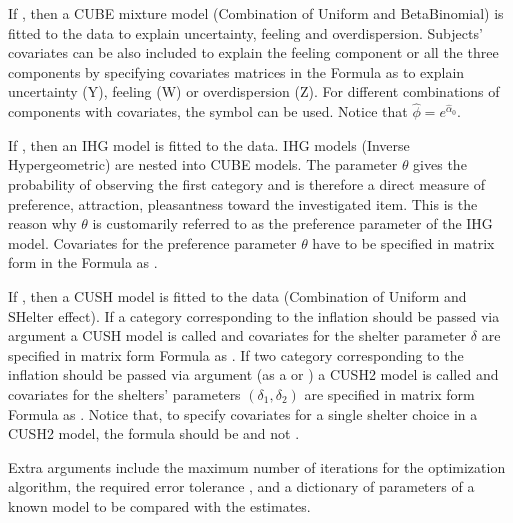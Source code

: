 \documentclass[letterpaper,10pt,english]{sphinxmanual}
\begin{document}
\sphinxAtStartPar
If , then a CUBE mixture model (Combination of Uniform and Beta\sphinxhyphen{}Binomial) is fitted to the data
to explain uncertainty, feeling and overdispersion.   Subjects’ covariates can be also included to explain the
feeling component or all the three components by  specifying covariates matrices in the Formula as
 to explain uncertainty (Y), feeling (W) or
overdispersion (Z). For different combinations of components with covariates, the symbol  can be used.
Notice that \(\hat\phi=e^{\hat\alpha_0}\).

\sphinxAtStartPar
If , then an IHG model is fitted to the data. IHG models (Inverse Hypergeometric) are nested into
CUBE models. The parameter \(\theta\) gives the probability of observing
the first category and is therefore a direct measure of preference, attraction, pleasantness toward the
investigated item. This is the reason why \(\theta\) is customarily referred to as the
preference parameter of the
IHG model. Covariates for the preference parameter \(\theta\) have to be specified
in matrix form in the Formula as .

\sphinxAtStartPar
If , then a CUSH model is fitted to the data (Combination of Uniform and SHelter effect).
If a category corresponding to the inflation should be
passed via argument  a CUSH model is called and
covariates for the shelter parameter \(\delta\)
are specified in matrix form Formula as .
If two category corresponding to the inflation should be
passed via argument  (as a  or ) a CUSH2 model is called and
covariates for the shelters’ parameters \((\delta_1,\delta_2)\)
are specified in matrix form Formula as .
Notice that, to specify covariates for a
single shelter choice in a CUSH2 model,
the formula should be  and not .

\sphinxAtStartPar
Extra arguments include the maximum
number of iterations  for the optimization algorithm,
the required error tolerance , and a dictionary of parameters of a known model
 to be compared with the estimates.
\end{document}

